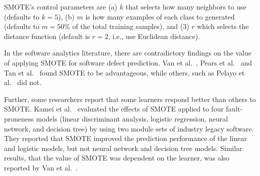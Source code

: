 \documentclass[sigconf,review, anonymous]{acmart}
\theoremstyle{break}
\theoremstyle{break}
\newcommand{\sma}{{\sc SMOTE}}
\begin{document}
{\sma}'s control parameters are (a) $k$ that selects how many neighbors to use  (defaults to $k=5$), (b) $m$ is how many examples of each class to generated (defaults to $m=50\%$ of the total training samples), and (3) $r$ which selects  the distance function (default is $r=2$,
i.e., use    
  Euclidean distance).





In the software analytics literature, there are contradictory findings on
the value of applying {\sma} for software defect prediction.
Van et al.~\cite{van2007experimental}, Pears et al.~\cite{pears2014synthetic} and Tan et al.~\cite{tan2015online} found {\sma} to be advantageous, while others, such as Pelayo et al.~\cite{pelayo2007applying} did not. 

Further, some researchers report that some learners respond better than others to {\sma}. Kamei et al.~\cite{kamei2007effects} evaluated the effects of {\sma} applied to  four fault-proneness models
(linear discriminant analysis, logistic regression, neural network, and decision tree) by
using two module sets of industry legacy software. They reported that {\sma} improved the prediction performance of the linear and logistic models, but not neural network and decision tree models. Similar results, that the value of {\sma} was dependent on the learner,
was also reported by Van et al.~\cite{van2007experimental}.
\end{document}
